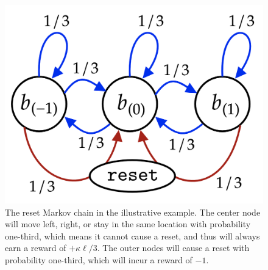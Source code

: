 \documentclass[sigconf, usenames, dvipsnames]{acmart}
\begin{document}
\begin{figure}
    \centering
    \includegraphics[width=0.7\linewidth]{img/toy_markov.png}
    \caption{The reset Markov chain in the illustrative example.  The center node will move left, right, or stay in the same location with probability one-third, which means it cannot cause a reset, and thus will always earn a reward of $+\kappa \ell /3$. The outer nodes will cause a reset with probability one-third, which will incur a reward of $-1$.
    \label{fig:toy_markov}}
\end{figure}
\end{document}
